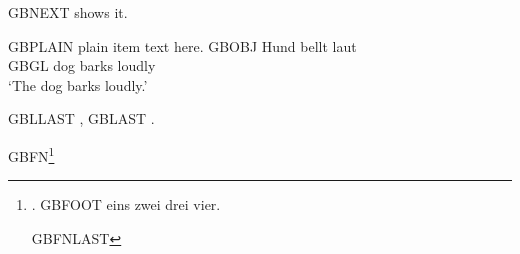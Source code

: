
\exrefcheck[words=3]

GBNEXT \Next shows it.

\begin{exe}
\ex GBPLAIN plain item text here.
\ex \gll GBOBJ Hund bellt laut\\
         GBGL dog barks loudly\\
    \glt `The dog barks loudly.'
\end{exe}

GBLLAST \LLast, GBLAST \Last.

GBFN\footnote{\ex. GBFOOT eins zwei drei vier.

GBFNLAST \Last}

